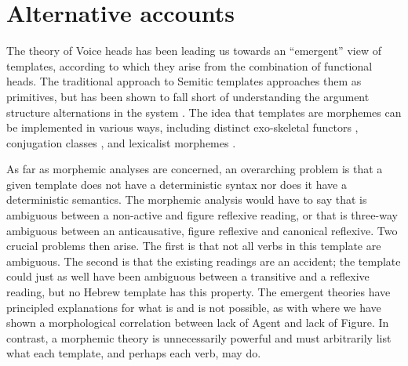 {{%
%






\section{Alternative accounts} \label{vz:others}
The theory of Voice heads has been leading us towards an ``emergent'' view of templates, according to which they arise from the combination of functional heads. The traditional approach to Semitic templates approaches them as primitives, but has been shown to fall short of understanding the argument structure alternations in the system \citep{doron03,kastner16phd,kastner17gjgl,kastner18nllt}. The idea that templates are morphemes can be implemented in various ways, including distinct exo-skeletal functors \citep{borer13oup}, conjugation classes \citep{arad05,aronoff07}, and lexicalist morphemes \citep{reinhartsiloni05,laks11,laks14}.

As far as morphemic analyses are concerned, an overarching problem is that a given template does not have a deterministic syntax nor does it have a deterministic semantics. The morphemic analysis would have to say that {\tnif} is ambiguous between a non-active and figure reflexive reading, or that {\thit} is three-way ambiguous between an anticausative, figure reflexive and canonical reflexive. Two crucial problems then arise. The first is that not all verbs in this template are ambiguous. The second is that the existing readings are an accident; the template could just as well have been ambiguous between a transitive and a reflexive reading, but no Hebrew template has this property. The emergent theories have principled explanations for what is and is not possible, as with {\tnif} where we have shown a morphological correlation between lack of Agent and lack of Figure. In contrast, a morphemic theory is unnecessarily powerful and must arbitrarily list what each template, and perhaps each verb, may do.

}}

